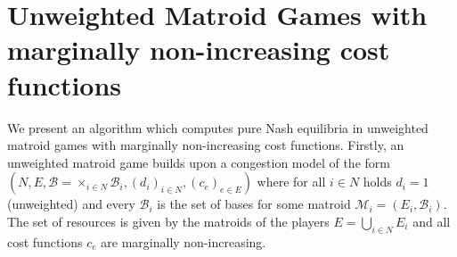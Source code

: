 \documentclass{scrartcl}
\theoremstyle{nonumberplain}
\newcommand{\tupel}[1]{\left(#1\right)}
\begin{document}
\section{Unweighted Matroid Games with marginally non-increasing cost
functions}
We present an algorithm which computes pure Nash equilibria in unweighted
matroid games with marginally non-increasing cost functions. Firstly, an
unweighted matroid game builds upon a congestion model of the form
$\tupel{N, E, \mathcal{B} = \times_{i\in N}\mathcal{B}_{i},
(d_{i})_{i\in N}, (c_{e})_{e\in E}}$ where for all $i\in N$ holds $d_{i} = 1$
(unweighted) and every $\mathcal{B}_{i}$ is the set of bases for some matroid
$\mathcal{M}_{i} = \tupel{E_{i}, \mathcal{B}_{i}}$. The set of resources is
given by the matroids of the players $E = \bigcup_{i\in N}E_{i}$ and all cost
functions $c_{e}$ are marginally non-increasing.
\end{document}
